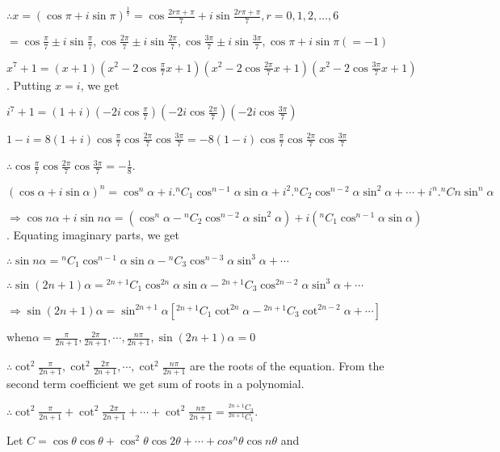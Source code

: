   $\therefore x = \left(\cos\pi + i \sin\pi\right)^{\frac{1}{7}} =
  \cos\frac{2r\pi + \pi}{7} + i \sin \frac{2r\pi + \pi}{7}, r = 0, 1, 2,
  \ldots, 6$

  $= \cos \frac{\pi}{7} \pm i \sin\frac{\pi}{7}, \cos \frac{2\pi}{7} \pm i
  \sin\frac{2\pi}{7}, \cos \frac{3\pi}{7} \pm i \sin\frac{3\pi}{7}, \cos
  \pi + i \sin \pi(= -1)$

  $x^7 + 1 = (x + 1)\left(x^2 - 2\cos\frac{\pi}{7}x + 1\right)\left(x^2 -
  2\cos\frac{2\pi}{7}x + 1\right)\left(x^2 - 2\cos\frac{3\pi}{7}x +
  1\right)$. Putting $x = i$, we get

  $i^7 + 1 = (1 +
  i)\left(-2i\cos\frac{\pi}{7}\right)\left(-2i\cos\frac{2\pi}{7}\right)\left(-2i\cos\frac{3\pi}{7}\right)$

  $1 - i = 8(1 + i)\cos\frac{\pi}{7}\cos\frac{2\pi}{7}\cos\frac{3\pi}{7} = -8(1 -
  i)\cos\frac{\pi}{7}\cos\frac{2\pi}{7}\cos\frac{3\pi}{7}$

  $\therefore \cos\frac{\pi}{7}\cos\frac{2\pi}{7}\cos\frac{3\pi}{7} = -\frac{1}{8}$.
\item $(\cos\alpha + i \sin\alpha)^n = \cos^n\alpha + i.{{}^nC_1}\cos^{n-1}\alpha
  \sin\alpha + i^2.{^nC_2}\cos^{n-2}\alpha \sin^2\alpha + \cdots +
  i^n.{^nCn}\sin^n\alpha$

  $\Rightarrow \cos n\alpha + i \sin n\alpha = (\cos^n\alpha -
  {^nC_2}\cos^{n-2}\alpha \sin^2\alpha) + i({^nC_1}\cos^{n-1}\alpha
  \sin\alpha)$. Equating imaginary parts, we get

  $\therefore \sin n\alpha = {^nC_1}\cos^{n-1}\alpha \sin\alpha - {}^nC_3\cos^{n-3}\alpha \sin^3\alpha +
  \cdots$

  $\therefore \sin (2n+1)\alpha = {}^{2n+1}C_1\cos^{2n}\alpha \sin\alpha - {}^{2n+1}C_3\cos^{2n-2}\alpha
  \sin^3\alpha + \cdots$

  $\Rightarrow \sin (2n+1)\alpha = \sin^{2n+1}\alpha[{^{2n+1}C_1\cot^{2n}}\alpha -
    {}^{2n+1}C_3\cot^{2n-2}\alpha + \cdots]$

  $\text{when} \alpha = \frac{\pi}{2n+1}, \frac{2\pi}{2n+1}, \cdots, \frac{n\pi}{2n+1}, \sin(2n+1)\alpha =
  0$

  $\therefore \cot^2\frac{\pi}{2n+1}, \cot^2\frac{2\pi}{2n+1}, \cdots, \cot^2\frac{n\pi}{2n+1}$ are the
  roots of the equation. From the second term coefficient we get sum of roots in a polynomial.

  $\therefore \cot^2\frac{\pi}{2n+1}+ \cot^2\frac{2\pi}{2n+1}+ \cdots+ \cot^2\frac{n\pi}{2n+1} =
  \frac{{}^{2n+1}C_3}{{}^{2n+1}C_1}$.
\item Let $C = \cos\theta \cos\theta + \cos^2\theta \cos 2\theta + \cdots + cos^n\theta \cos n\theta$
  and

